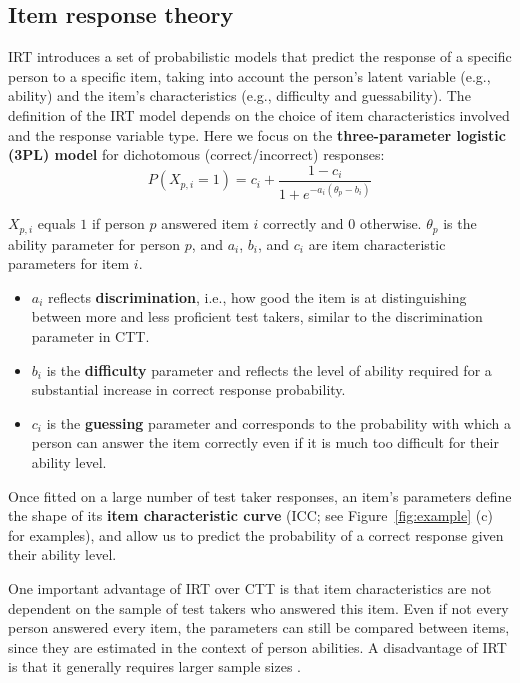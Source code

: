 \documentclass[11pt]{article}
\begin{document}
\subsection{Item response theory}

IRT introduces a set of probabilistic models that predict the response of a specific person to a specific item, taking into account the person's latent variable (e.g., ability) and the item's characteristics (e.g., difficulty and guessability). The definition of the IRT model depends on the choice of item characteristics involved and the response variable type. Here we focus on the \textbf{three-parameter logistic (3PL) model} for dichotomous (correct/incorrect) responses:
\begin{equation}
  P(X_{p,i} = 1) = c_i + \frac{1 - c_i}{1 + e^{-a_i (\theta_p - b_i)}}
  \label{eq:3plm}
\end{equation}

$X_{p,i}$ equals $1$ if person $p$ answered item $i$ correctly and $0$ otherwise. $\theta_p$ is the ability parameter for person $p$, and $a_i$, $b_i$, and $c_i$ are item characteristic parameters for item $i$.

\begin{itemize}
  \item $a_i$ reflects \textbf{discrimination}, i.e., how good the item is at distinguishing between more and less proficient test takers, similar to the discrimination parameter in CTT.
  \item $b_i$ is the \textbf{difficulty} parameter and reflects the level of ability required for a substantial increase in correct response probability.
  \item $c_i$ is the \textbf{guessing} parameter and corresponds to the probability with which a person can answer the item correctly even if it is much too difficult for their ability level.
\end{itemize}

Once fitted on a large number of test taker responses, an item's parameters define the shape of its \textbf{item characteristic curve} (ICC; see Figure~\ref{fig:example} (c) for examples), and allow us to predict the probability of a correct response given their ability level.

One important advantage of IRT over CTT is that item characteristics are not dependent on the sample of test takers who answered this item. Even if not every person answered every item, the parameters can still be compared between items, since they are estimated in the context of person abilities. A disadvantage of IRT is that it generally requires larger sample sizes \citep{Hambleton1993,Fan1998}.
\end{document}
